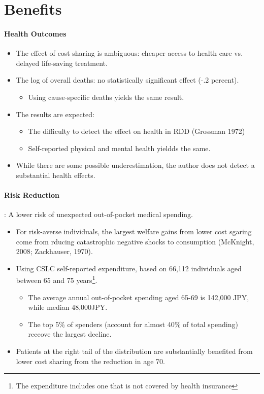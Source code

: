 \documentclass[../root]{subfiles}
\begin{document}
    \section{Benefits}

    \paragraph{Health Outcomes}

    \begin{itemize}
      \item The effect of cost sharing is ambiguous: cheaper access to health care vs. delayed life-saving treatment.
      \item The log of overall deaths: no statistically significant effect (-.2 percent).
      \begin{itemize}
        \item Using cause-specific deaths yields the same result.
      \end{itemize}
      \item The results are expected:
      \begin{itemize}
        \item The difficulty to detect the effect on health in RDD (Grossman 1972)
        \item Self-reported physical and mental health yieldds the same.
      \end{itemize}
      \item While there are some possible underestimation, the author does not detect a substantial health effects.
    \end{itemize}

    \paragraph{Risk Reduction}: A lower risk of unexpected out-of-pocket medical spending.

    \begin{itemize}
      \item For risk-averse individuals, the largest welfare gains from lower cost sgaring come from rducing catastrophic negative shocks to consumption (McKnight, 2008; Zackhauser, 1970).
      \item Using CSLC self-reported expenditure, based on 66,112 individuals aged between 65 and 75 years\footnote{The expenditure includes one that is not covered by health insurance}.
      \begin{itemize}
        \item The average annual out-of-pocket spending aged 65-69 is 142,000 JPY, while median 48,000JPY.
        \item The top 5\% of spenders (account for almost 40\% of total spending) receove the largest decline.
      \end{itemize}
      \item Patients at the right tail of the distribution are substantially benefited from lower cost sharing from the reduction in age 70.
    \end{itemize}
\end{document}
